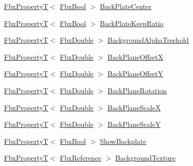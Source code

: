 \begin{DoxyCompactItemize}
\item 
\hyperlink{class_fbx_property_t}{Fbx\+PropertyT}$<$ \hyperlink{fbxtypes_8h_a92e0562b2fe33e76a242f498b362262e}{Fbx\+Bool} $>$ \hyperlink{class_fbx_camera_afc328eb5b70302973c991310d7ff9be3}{Back\+Plate\+Center}
\item 
\hyperlink{class_fbx_property_t}{Fbx\+PropertyT}$<$ \hyperlink{fbxtypes_8h_a92e0562b2fe33e76a242f498b362262e}{Fbx\+Bool} $>$ \hyperlink{class_fbx_camera_a4ee8a7a4e0c74fe8b76e83ee572a9b7c}{Back\+Plate\+Keep\+Ratio}
\item 
\hyperlink{class_fbx_property_t}{Fbx\+PropertyT}$<$ \hyperlink{fbxtypes_8h_a171e72a1c46fc15c1a6c9c31948c1c5b}{Fbx\+Double} $>$ \hyperlink{class_fbx_camera_adee33826ef47ba5fc4719c78b6e5d582}{Background\+Alpha\+Treshold}
\item 
\hyperlink{class_fbx_property_t}{Fbx\+PropertyT}$<$ \hyperlink{fbxtypes_8h_a171e72a1c46fc15c1a6c9c31948c1c5b}{Fbx\+Double} $>$ \hyperlink{class_fbx_camera_a2a71f39683269b49b67e007c7d19d67b}{Back\+Plane\+OffsetX}
\item 
\hyperlink{class_fbx_property_t}{Fbx\+PropertyT}$<$ \hyperlink{fbxtypes_8h_a171e72a1c46fc15c1a6c9c31948c1c5b}{Fbx\+Double} $>$ \hyperlink{class_fbx_camera_abfbc1d3377ed9721492971011fd8f5ed}{Back\+Plane\+OffsetY}
\item 
\hyperlink{class_fbx_property_t}{Fbx\+PropertyT}$<$ \hyperlink{fbxtypes_8h_a171e72a1c46fc15c1a6c9c31948c1c5b}{Fbx\+Double} $>$ \hyperlink{class_fbx_camera_a25d0defefe7a7c69ee9fddfc8ea51036}{Back\+Plane\+Rotation}
\item 
\hyperlink{class_fbx_property_t}{Fbx\+PropertyT}$<$ \hyperlink{fbxtypes_8h_a171e72a1c46fc15c1a6c9c31948c1c5b}{Fbx\+Double} $>$ \hyperlink{class_fbx_camera_a34ab778778521406789a1798451791db}{Back\+Plane\+ScaleX}
\item 
\hyperlink{class_fbx_property_t}{Fbx\+PropertyT}$<$ \hyperlink{fbxtypes_8h_a171e72a1c46fc15c1a6c9c31948c1c5b}{Fbx\+Double} $>$ \hyperlink{class_fbx_camera_a24d51fab8fc1c619d813375b2aa88cfe}{Back\+Plane\+ScaleY}
\item 
\hyperlink{class_fbx_property_t}{Fbx\+PropertyT}$<$ \hyperlink{fbxtypes_8h_a92e0562b2fe33e76a242f498b362262e}{Fbx\+Bool} $>$ \hyperlink{class_fbx_camera_a3e824d5e68ecd7ff571c3d783b3a82b3}{Show\+Backplate}
\item 
\hyperlink{class_fbx_property_t}{Fbx\+PropertyT}$<$ \hyperlink{fbxtypes_8h_a44df6a2eec915cf27cd481e5c5e48a24}{Fbx\+Reference} $>$ \hyperlink{class_fbx_camera_a23d1fddeed7661a66461fbe0f27cedde}{Background\+Texture}
\item 

\end{DoxyCompactItemize}
